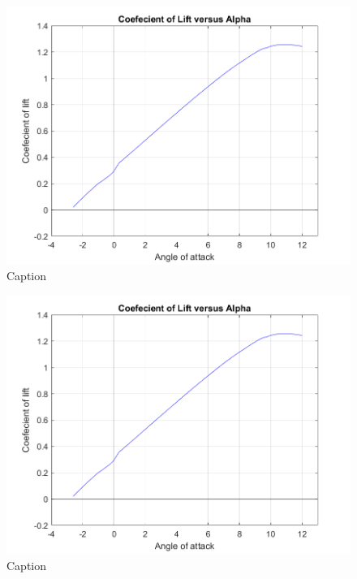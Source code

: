 \documentclass[12 pt]{article}
\begin{document}
\begin{figure}[h]
    \centering
    \includegraphics[width = \linewidth]{Codes/Week 6/Cl_alpha.png}
    \caption{Caption}
    \label{fig:enter-label}
\end{figure}

\begin{figure}[h]
    \centering
    \includegraphics[width = \linewidth]{Codes/Week 6/Cl_alpha.png}
    \caption{Caption}
    \label{fig:enter-label}
\end{figure}
\end{document}
